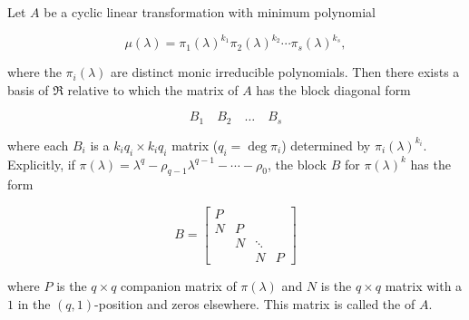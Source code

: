 Let $A$ be a cyclic linear transformation with minimum polynomial

$$\mu(\lambda) = \pi_1(\lambda)^{k_1} \pi_2(\lambda)^{k_2} \cdots \pi_s(\lambda)^{k_s},$$

where the $\pi_i(\lambda)$ are distinct monic irreducible polynomials. Then there exists a basis of $\Re$ relative to which the matrix of $A$ has the block diagonal form

$$B_1 \quad B_2 \quad \dots \quad B_s$$

where each $B_i$ is a $k_i q_i \times k_i q_i$ matrix ($q_i = \deg \pi_i$) determined by $\pi_i(\lambda)^{k_i}$. Explicitly, if $\pi(\lambda) = \lambda^q - \rho_{q-1}\lambda^{q-1} - \cdots - \rho_0$, the block $B$ for $\pi(\lambda)^k$ has the form

$$B = \begin{bmatrix}
P & & & \\
N & P & & \\
& N & \ddots & \\
& & N & P
\end{bmatrix}$$

where $P$ is the $q \times q$ companion matrix of $\pi(\lambda)$ and $N$ is the $q \times q$ matrix with a $1$ in the $(q, 1)$-position and zeros elsewhere. This matrix is called the  of $A$.
